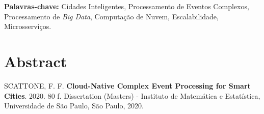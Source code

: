 \documentclass[11pt,twoside,a4paper]{book}
\begin{document}
 
 
 
 \noindent \textbf{Palavras-chave:} Cidades Inteligentes, Processamento de Eventos Complexos, Processamento de \emph{Big Data}, Computação de Nuvem, Escalabilidade, Microsserviços.

\chapter*{Abstract}
\noindent SCATTONE, F. F. \textbf{Cloud-Native Complex Event Processing for Smart Cities}. 
2020. 80 f.
Dissertation (Masters) - Instituto de Matemática e Estatística,
Universidade de São Paulo, São Paulo, 2020.
\\
\end{document}
